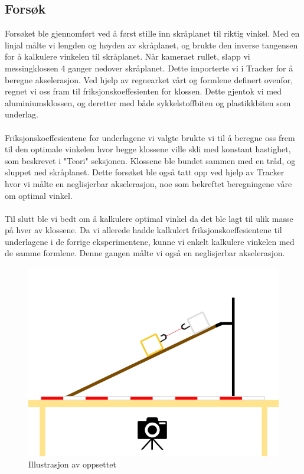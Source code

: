 \documentclass[10pt,a4paper]{report}
\begin{document}
\subsection*{Forsøk}
Forsøket ble gjennomført ved å først stille inn skråplanet til riktig vinkel. Med en linjal målte vi lengden og høyden av skråplanet, og brukte den inverse tangensen for å kalkulere vinkelen til skråplanet. Når kameraet rullet, slapp vi messingklossen 4 ganger nedover skråplanet. Dette importerte vi i Tracker for å beregne akselerasjon. Ved hjelp av regnearket vårt og formlene definert ovenfor, regnet vi oss fram til friksjonskoeffesienten for klossen. Dette gjentok vi med aluminiumsklossen, og deretter med både sykkelstoffbiten og plastikkbiten som underlag. \\
\\Friksjonskoeffesientene for underlagene vi valgte brukte vi til å beregne oss frem til den optimale vinkelen hvor begge klossene ville skli med konstant hastighet, som beskrevet i "Teori" seksjonen. Klossene ble bundet sammen med en tråd, og sluppet ned skråplanet. Dette forsøket ble også tatt opp ved hjelp av Tracker hvor vi målte en neglisjerbar akselerasjon, noe som bekreftet beregningene våre om optimal vinkel.\\
\\Til slutt ble vi bedt om å kalkulere optimal vinkel da det ble lagt til ulik masse på hver av klossene. Da vi allerede hadde kalkulert friksjonskoeffesientene til underlagene i de forrige eksperimentene, kunne vi enkelt kalkulere vinkelen med de samme formlene. Denne gangen målte vi også en neglisjerbar akselerasjon.

\begin{figure}
\centerline{\includegraphics[scale=0.5]{oppsett}}
\caption{Illustrasjon av oppsettet}
\label{oppsett}
\end{figure}
\end{document}
